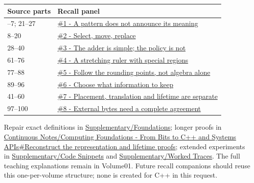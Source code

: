 {\def\LTcaptype{none} %
\begin{longtable}[]{@{}ll@{}}
\toprule\noalign{}
Source parts & Recall panel \\
\midrule\noalign{}
\endhead
\bottomrule\noalign{}
\endlastfoot
1--7; 21--27 & \hyperref[appendix-ef4d27797a92-a-pattern-does-not-announce-its-meaning]{\#1 - A pattern does not announce its meaning} \\
8--20 & \hyperref[appendix-ef4d27797a92-select-move-replace]{\#2 - Select, move, replace} \\
28--40 & \hyperref[appendix-ef4d27797a92-the-adder-is-simple-the-policy-is-not]{\#3 - The adder is simple; the policy is not} \\
61--76 & \hyperref[appendix-ef4d27797a92-a-stretching-ruler-with-special-regions]{\#4 - A stretching ruler with special regions} \\
77--88 & \hyperref[appendix-ef4d27797a92-follow-the-rounding-points-not-algebra-alone]{\#5 - Follow the rounding points, not algebra alone} \\
89--96 & \hyperref[appendix-ef4d27797a92-choose-what-information-to-keep]{\#6 - Choose what information to keep} \\
41--60 & \hyperref[appendix-ef4d27797a92-placement-translation-and-lifetime-are-separate]{\#7 - Placement, translation and lifetime are separate} \\
97--100 & \hyperref[appendix-ef4d27797a92-external-bytes-need-a-complete-agreement]{\#8 - External bytes need a complete agreement} \\
\end{longtable}
}

Repair exact definitions in \hyperref[appendix-fd090d982a15]{Supplementary/Foundations}; longer proofs in \hyperref[01-foundations-i-ch010-reconstruct-the-representation-and-lifetime-proofs]{Continuous Notes/Computing Foundations - From Bits to C++ and Systems APIs\#Reconstruct the representation and lifetime proofs}; extended experiments in \hyperref[appendix-4e2236f53445]{Supplementary/Code Snippets} and \hyperref[appendix-92ff77d4dfdc]{Supplementary/Worked Traces}. The full teaching explanations remain in Volume01. Future recall companions should reuse this one-per-volume structure; none is created for C++ in this request.
